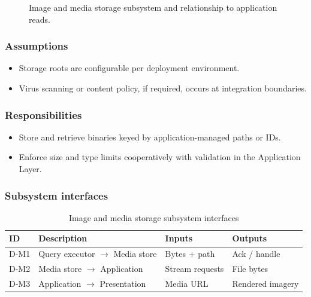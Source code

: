 \begin{figure}[H]
\centering
{}
\caption{Image and media storage subsystem and relationship to application reads.}
\label{fig:data-media}
\end{figure}

\subsubsection{Assumptions}
\begin{itemize}
  \item Storage roots are configurable per deployment environment.
  \item Virus scanning or content policy, if required, occurs at integration boundaries.
\end{itemize}

\subsubsection{Responsibilities}
\begin{itemize}
  \item Store and retrieve binaries keyed by application-managed paths or IDs.
  \item Enforce size and type limits cooperatively with validation in the Application Layer.
\end{itemize}

\subsubsection{Subsystem interfaces}
\begin{table}[H]
\centering
\small
\begin{tabular}{|p{0.85cm}|p{3.5cm}|p{3.0cm}|p{3.5cm}|}
\hline
\textbf{ID} & \textbf{Description} & \textbf{Inputs} & \textbf{Outputs} \\
\hline
D-M1 & Query executor $\rightarrow$ Media store & Bytes + path & Ack / handle \\
\hline
D-M2 & Media store $\rightarrow$ Application & Stream requests & File bytes \\
\hline
D-M3 & Application $\rightarrow$ Presentation & Media URL & Rendered imagery \\
\hline
\end{tabular}
\caption{Image and media storage subsystem interfaces}
\end{table}
